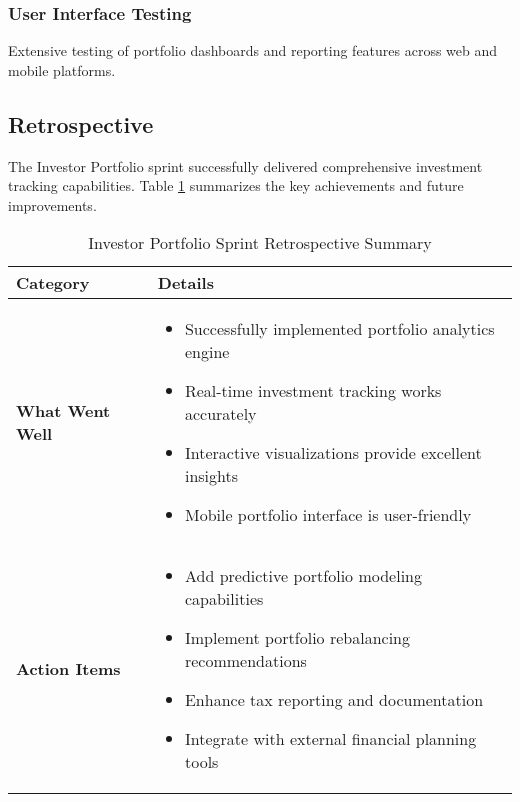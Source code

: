 \subsubsection{User Interface Testing}
Extensive testing of portfolio dashboards and reporting features across web and mobile platforms.

\subsection{Retrospective}

The Investor Portfolio sprint successfully delivered comprehensive investment tracking capabilities. Table \ref{tab:investor-portfolio-retrospective} summarizes the key achievements and future improvements.

\begin{table}[htbp]
    \centering
    \begin{tabular}{|p{3cm}|p{10cm}|}
        \hline
        \textbf{Category} & \textbf{Details} \\
        \hline
        \textbf{What Went Well} & 
        \begin{itemize}
            \item Successfully implemented portfolio analytics engine
            \item Real-time investment tracking works accurately
            \item Interactive visualizations provide excellent insights
            \item Mobile portfolio interface is user-friendly
        \end{itemize} \\
        \hline
        \textbf{Action Items} & 
        \begin{itemize}
            \item Add predictive portfolio modeling capabilities
            \item Implement portfolio rebalancing recommendations
            \item Enhance tax reporting and documentation
            \item Integrate with external financial planning tools
        \end{itemize} \\
        \hline
    \end{tabular}
    \caption{Investor Portfolio Sprint Retrospective Summary}
    \label{tab:investor-portfolio-retrospective}
\end{table}

